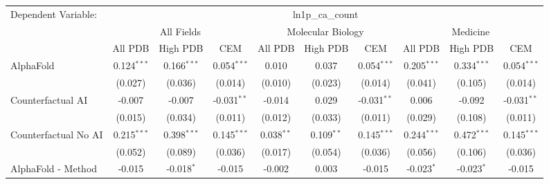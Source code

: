 \begingroup
\centering
\begin{tabular}{lccccccccc}
   \tabularnewline \midrule \midrule
   Dependent Variable: & \multicolumn{9}{c}{ln1p\_ca\_count}\\
 & \multicolumn{3}{c}{All Fields} & \multicolumn{3}{c}{Molecular Biology} & \multicolumn{3}{c}{Medicine} \\
\cmidrule(lr){2-7} \cmidrule(lr){5-10} \cmidrule(lr){8-7}
 & \multicolumn{1}{c}{All PDB} & \multicolumn{1}{c}{High PDB} & \multicolumn{1}{c}{CEM} & \multicolumn{1}{c}{All PDB} & \multicolumn{1}{c}{High PDB} & \multicolumn{1}{c}{CEM} & \multicolumn{1}{c}{All PDB} & \multicolumn{1}{c}{High PDB} & \multicolumn{1}{c}{CEM} \\
\cmidrule(lr){2-3} \cmidrule(lr){3-4} \cmidrule(lr){4-5} \cmidrule(lr){5-6} \cmidrule(lr){6-7} \cmidrule(lr){7-8} \cmidrule(lr){8-9} \cmidrule(lr){9-10} \cmidrule(lr){10-3}
   AlphaFold                                                   & 0.124$^{***}$  & 0.166$^{***}$ & 0.054$^{***}$  & 0.010          & 0.037        & 0.054$^{***}$  & 0.205$^{***}$  & 0.334$^{***}$ & 0.054$^{***}$\\   
                                                               & (0.027)        & (0.036)       & (0.014)        & (0.010)        & (0.023)      & (0.014)        & (0.041)        & (0.105)       & (0.014)\\   
   Counterfactual AI                                           & -0.007         & -0.007        & -0.031$^{**}$  & -0.014         & 0.029        & -0.031$^{**}$  & 0.006          & -0.092        & -0.031$^{**}$\\   
                                                               & (0.015)        & (0.034)       & (0.011)        & (0.012)        & (0.033)      & (0.011)        & (0.029)        & (0.108)       & (0.011)\\   
   Counterfactual No AI                                        & 0.215$^{***}$  & 0.398$^{***}$ & 0.145$^{***}$  & 0.038$^{**}$   & 0.109$^{**}$ & 0.145$^{***}$  & 0.244$^{***}$  & 0.472$^{***}$ & 0.145$^{***}$\\   
                                                               & (0.052)        & (0.089)       & (0.036)        & (0.017)        & (0.054)      & (0.036)        & (0.056)        & (0.106)       & (0.036)\\   
   AlphaFold - Method                                          & -0.015         & -0.018$^{*}$  & -0.015         & -0.002         & 0.003        & -0.015         & -0.023$^{*}$   & -0.023$^{*}$  & -0.015\\   

\end{tabular}
